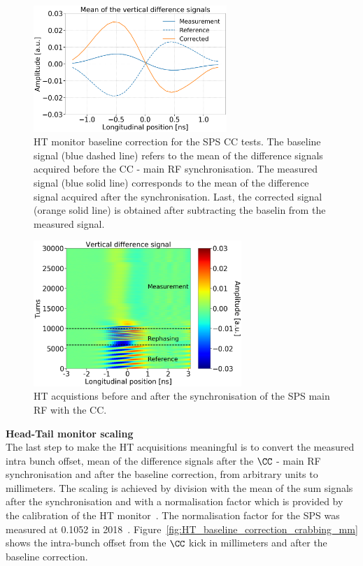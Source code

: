 \begin{figure}[!h]
   \centering         
   \includegraphics[width=0.65\textwidth]{images/Ch4/HT_measures_vs_reference_vs_corrected__20180530_135105_baseline_correction_new_version.png}
       \caption{HT monitor baseline correction for the SPS CC tests. The baseline signal (blue dashed line) refers to the mean of the difference signals acquired before the CC - main RF synchronisation. The measured signal (blue solid line) corresponds to the mean of the difference signal acquired after the synchronisation. Last, the corrected signal (orange solid line) is obtained after subtracting the baselin from the measured signal.}
       \label{fig:HT_baseline_correction}
\end{figure}

\begin{figure}[!h]
   \centering         
   \includegraphics[width=0.7\textwidth]{images/Ch4/HT_2D__20180530_135105_before_after_sunchronisation_new_version.png}
       \caption{HT acquistions before and after the synchronisation of the SPS main RF with the CC.}
       \label{fig:HT_baseline_correction_measurements_2D}
\end{figure}

\normalsize{\textbf{Head-Tail monitor scaling}}\\
The last step to make the HT acquisitions meaningful is to convert the measured intra bunch offset, mean of the difference signals after the $\CC$ - main RF synchronisation and after the baseline correction, from arbitrary units to millimeters. The scaling is achieved by division with the mean of the sum signals after the synchronisation and with a normalisation factor which is provided by the calibration of the HT monitor~\cite{PhysRevAccelBeams.22.112803}. The normalisation factor for the SPS was measured at 0.1052 in 2018~\cite{HT_calibration_2018}. Figure~\ref{fig:HT_baseline_correction_crabbing_mm} shows the intra-bunch offset from the $\CC$ kick in millimeters and after the baseline correction. 


